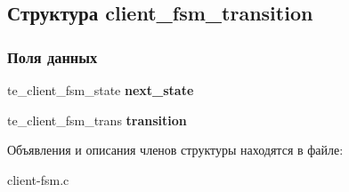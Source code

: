 \hypertarget{structclient__fsm__transition}{}\subsection{Структура client\+\_\+fsm\+\_\+transition}
\label{structclient__fsm__transition}
\subsubsection*{Поля данных}
\begin{DoxyCompactItemize}
\item 
te\+\_\+client\+\_\+fsm\+\_\+state {\bfseries next\+\_\+state}\hypertarget{structclient__fsm__transition_a6cff3eebfc9c45b3ff0e5b95302d4402}{}\label{structclient__fsm__transition_a6cff3eebfc9c45b3ff0e5b95302d4402}

\item 
te\+\_\+client\+\_\+fsm\+\_\+trans {\bfseries transition}\hypertarget{structclient__fsm__transition_a139655c3638fa2ce008a6fddd1ab620b}{}\label{structclient__fsm__transition_a139655c3638fa2ce008a6fddd1ab620b}

\end{DoxyCompactItemize}


Объявления и описания членов структуры находятся в файле\+:\begin{DoxyCompactItemize}
\item 
client-\/fsm.\+c\end{DoxyCompactItemize}
